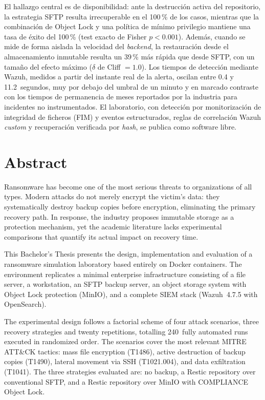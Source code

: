 \documentclass[12pt,twoside]{book}
\begin{document}
El hallazgo central es de disponibilidad: ante la destrucción activa del
repositorio, la estrategia SFTP resulta irrecuperable en el 100\,\% de los casos,
mientras que la combinación de Object Lock y una política de mínimo privilegio
mantiene una tasa de éxito del 100\,\% (test exacto de Fisher $p < 0.001$). Además,
cuando se mide de forma aislada la velocidad del \textit{backend}, la restauración
desde el almacenamiento inmutable resulta un 39\,\% más rápida que desde SFTP, con
un tamaño del efecto máximo ($\delta$ de Cliff $=1.0$). Los tiempos de detección
mediante Wazuh, medidos a partir del instante real de la alerta, oscilan entre 0.4
y 11.2~segundos, muy por debajo del umbral de un minuto y en marcado contraste con
los tiempos de permanencia de meses reportados por la industria para incidentes no
instrumentados. El laboratorio, con detección por monitorización de integridad de
ficheros (FIM) y eventos estructurados, reglas de correlación Wazuh \textit{custom}
y recuperación verificada por \textit{hash}, se publica como software libre.

\cleardoublepage

\chapter*{Abstract}

Ransomware has become one of the most serious threats to organizations of all types.
Modern attacks do not merely encrypt the victim's data: they systematically destroy
backup copies before encryption, eliminating the primary recovery path. In response,
the industry proposes immutable storage as a protection mechanism, yet the academic
literature lacks experimental comparisons that quantify its actual impact on recovery
time.

This Bachelor's Thesis presents the design, implementation and evaluation of a
ransomware simulation laboratory based entirely on Docker containers. The environment
replicates a minimal enterprise infrastructure consisting of a file server, a
workstation, an SFTP backup server, an object storage system with Object Lock
protection (MinIO), and a complete SIEM stack (Wazuh~4.7.5 with OpenSearch).

The experimental design follows a factorial scheme of four attack scenarios, three
recovery strategies and twenty repetitions, totalling 240~fully automated runs
executed in randomized order. The scenarios cover the most relevant MITRE ATT\&CK
tactics: mass file encryption (T1486), active destruction of backup copies (T1490),
lateral movement via SSH (T1021.004), and data exfiltration (T1041). The three
strategies evaluated are: no backup, a Restic repository over conventional SFTP, and
a Restic repository over MinIO with COMPLIANCE Object Lock.
\end{document}
